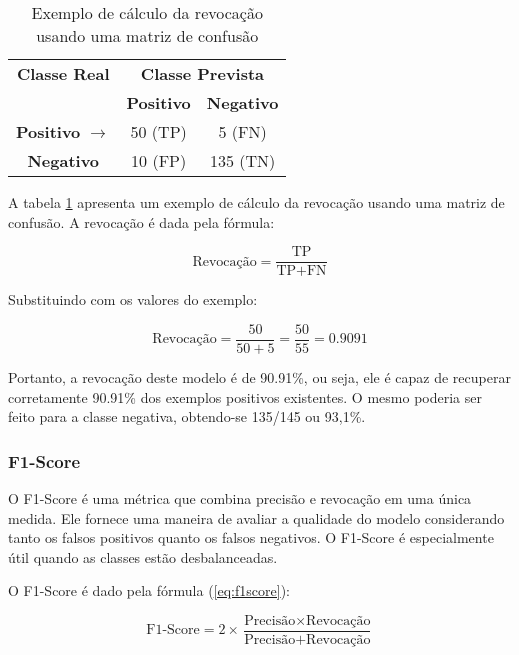 \begin{table}[h]
\centering
\caption{Exemplo de cálculo da revocação usando uma matriz de confusão}
\label{tab:exemplo_revocacao}
\begin{tabular}{c|cc}
\multicolumn{1}{c}{\textbf{Classe Real}} & \multicolumn{2}{c}{\textbf{Classe Prevista}} \\ \cline{2-3}
\multicolumn{1}{c}{} & \textbf{Positivo}  & \textbf{Negativo} \\ \hline
\multicolumn{1}{c}{\textbf{Positivo} $\rightarrow$} & \cellcolor{green!25}50 (TP) & \cellcolor{red!25}5 (FN) \\
\multicolumn{1}{c}{\textbf{Negativo}} & \cellcolor{red!25}10 (FP)  & \cellcolor{green!25}135 (TN) \\ \hline
\end{tabular}
\end{table}

A tabela \ref{tab:exemplo_revocacao} apresenta um exemplo de cálculo da revocação usando uma matriz de confusão. A revocação é dada pela fórmula:

\[ \text{Revocação} = \frac{\text{TP}}{\text{TP} + \text{FN}} \]

Substituindo com os valores do exemplo:

\[ \text{Revocação} = \frac{50}{50 + 5} = \frac{50}{55} = 0.9091 \]

Portanto, a revocação deste modelo é de 90.91\%, ou seja, ele é capaz de recuperar corretamente 90.91\% dos exemplos positivos existentes.  O mesmo poderia ser feito para a classe negativa, obtendo-se 135/145 ou 93,1\%.



\subsubsection{F1-Score}

O F1-Score é uma métrica que combina precisão e revocação em uma única medida. Ele fornece uma maneira de avaliar a qualidade do modelo considerando tanto os falsos positivos quanto os falsos negativos. O F1-Score é especialmente útil quando as classes estão desbalanceadas.

O F1-Score é dado pela fórmula (\ref{eq:f1score}):

\begin{equation}
\text{F1-Score} = 2 \times \frac{\text{Precisão} \times \text{Revocação}}{\text{Precisão} + \text{Revocação}} \label{eq:f1score}
\end{equation}

